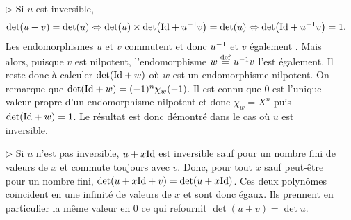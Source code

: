\begin{solution}
    \begin{itemize}
        \item[$\rhd$] Si $u$ est inversible,
        $$\det(u+v) = \det(u) \Leftrightarrow \det(u) \times \det(\mathrm{Id} + u^{-1}v) = \det(u) \Leftrightarrow \det(\mathrm{Id} + u^{-1}v) = 1.$$
        Les endomorphismes $u$ et $v$ commutent et donc $u^{-1}$ et $v$ également \note. 
        Mais alors, puisque $v$ est nilpotent, l'endomorphisme $w \overset{\mathrm{\tiny def}}{=} u^{-1}v$ l'est également. Il reste donc à calculer $\det(\mathrm{Id} + w)$ où $w$ est un endomorphisme nilpotent. On remarque que $\det(\mathrm{Id} + w) = (-1)^n \chi_w(-1)$. Il est connu que $0$ est l'unique valeur propre d'un endomorphisme nilpotent et donc $\chi_w = X^n$ puis $\det(\mathrm{Id}+w) = 1$. Le résultat est donc démontré dans le cas où $u$ est inversible. \item[$\rhd$] Si $u$ n'est pas inversible, $u + x \mathrm{Id}$ est inversible sauf pour un nombre fini de valeurs de $x$ et commute toujours avec $v$. Donc, pour tout $x$ sauf peut-être pour un nombre fini, $\det(u + x \mathrm{Id} + v) = \det(u + x \mathrm{Id})$. Ces deux polynômes coïncident en une infinité de valeurs de $x$ et sont donc égaux. Ils prennent en particulier la même valeur en $0$ ce qui refournit $\det(u+v) = \det u$.
    \end{itemize}    
\end{solution}

